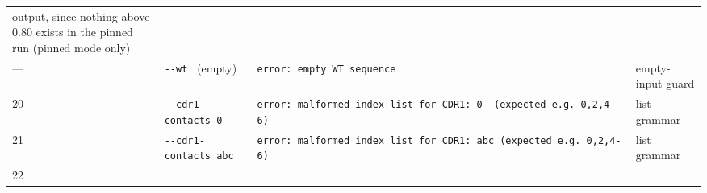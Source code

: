 \documentclass[12pt,a4paper]{article}
\begin{document}
\begin{longtable}[]{@{}llll@{}}
\begin{minipage}[t]{0.22\columnwidth}
output, since nothing above 0.80 exists in the pinned run (pinned mode
only)\strut
\end{minipage}\tabularnewline
\begin{minipage}[t]{0.22\columnwidth}\raggedright
---\strut
\end{minipage} & \begin{minipage}[t]{0.22\columnwidth}\raggedright
\texttt{-\/-wt\ \textquotesingle{}\textquotesingle{}} (empty)\strut
\end{minipage} & \begin{minipage}[t]{0.22\columnwidth}\raggedright
\texttt{error:\ empty\ WT\ sequence}\strut
\end{minipage} & \begin{minipage}[t]{0.22\columnwidth}\raggedright
empty-input guard\strut
\end{minipage}\tabularnewline
\begin{minipage}[t]{0.22\columnwidth}\raggedright
20\strut
\end{minipage} & \begin{minipage}[t]{0.22\columnwidth}\raggedright
\texttt{-\/-cdr1-contacts\ 0-}\strut
\end{minipage} & \begin{minipage}[t]{0.22\columnwidth}\raggedright
\texttt{error:\ malformed\ index\ list\ for\ CDR1:\ \textquotesingle{}0-\textquotesingle{}\ (expected\ e.g.\ 0,2,4-6)}\strut
\end{minipage} & \begin{minipage}[t]{0.22\columnwidth}\raggedright
list grammar\strut
\end{minipage}\tabularnewline
\begin{minipage}[t]{0.22\columnwidth}\raggedright
21\strut
\end{minipage} & \begin{minipage}[t]{0.22\columnwidth}\raggedright
\texttt{-\/-cdr1-contacts\ abc}\strut
\end{minipage} & \begin{minipage}[t]{0.22\columnwidth}\raggedright
\texttt{error:\ malformed\ index\ list\ for\ CDR1:\ \textquotesingle{}abc\textquotesingle{}\ (expected\ e.g.\ 0,2,4-6)}\strut
\end{minipage} & \begin{minipage}[t]{0.22\columnwidth}\raggedright
list grammar\strut
\end{minipage}\tabularnewline
\begin{minipage}[t]{0.22\columnwidth}\raggedright
22\strut
\end{minipage} & \begin{minipage}[t]{0.22\columnwidth}\raggedright

\end{minipage}
\end{longtable}
\end{document}
